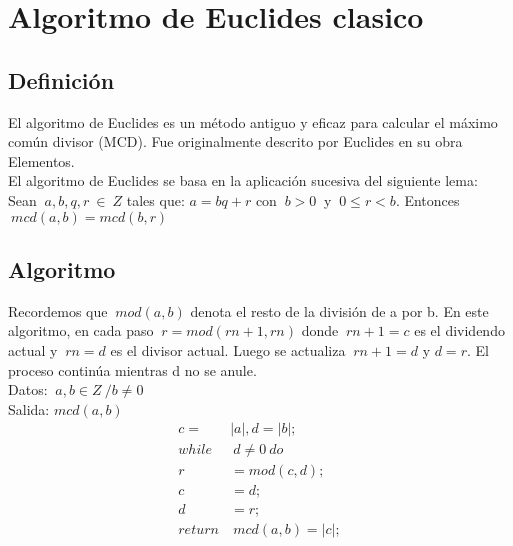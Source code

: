\chapter{Algoritmo de Euclides clasico}

\section{Definici\'on}
El algoritmo de Euclides es un m\'etodo antiguo y eficaz para calcular el m\'aximo com\'un divisor (MCD). Fue originalmente descrito por Euclides en su obra Elementos.\\
El algoritmo de Euclides se basa en la aplicaci\'on sucesiva del siguiente lema:\\ 
Sean $\:a, b, q, r \:\in\:Z$ tales que: $a = bq + r$ con $\:b > 0\:$ y $\:0 ≤ r < b$. Entonces $\:mcd (a, b) = mcd (b, r)$
\section{Algoritmo}
Recordemos que $\:mod(a, b)$ denota el resto de la división de a por b. En este algoritmo, en cada paso $\:r = mod (rn+1, rn)$ donde $\:rn+1 = c$ es el dividendo actual y $\:rn = d$ es el divisor actual.
Luego se actualiza $\:rn+1 = d$ y $d = r$. El proceso continúa mientras d no se anule.\\
Datos: $\:a,b \in Z\:/b\neq0$\\
Salida: $mcd(a,b)$\\
\begin{equation*}
 \begin{align}
  c=&|a|,d=|b|;\\
  while&\:d\neq0\:do\\
  r&=mod(c,d);\\
  c&=d;\\
  d&=r;\\
  return&\:mcd(a,b)=|c|;
 \end{align}
\end{equation*}
